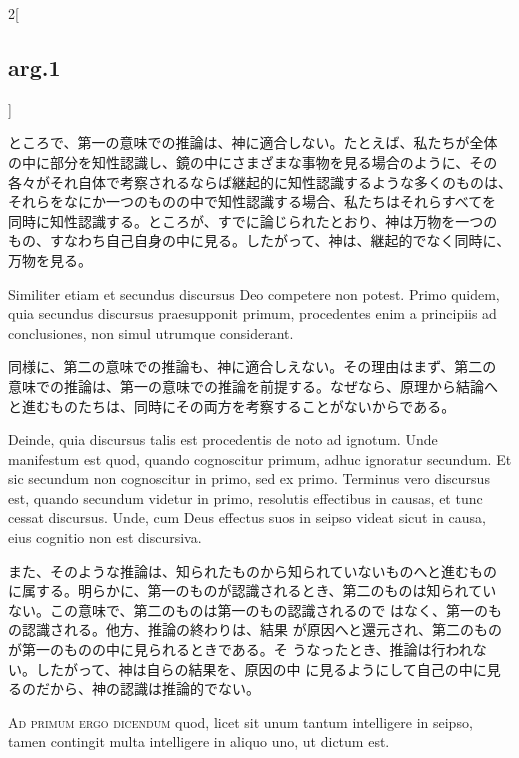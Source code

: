 \documentclass[paper=a4paper,fontsize=10pt,jafontsize=9pt,titlepage]{jlreq}
\begin{document}
\begin{paracol}{2}[\subsection{arg.1}]
\switchcolumn

ところで、第一の意味での推論は、神に適合しない。たとえば、私たちが全体
の中に部分を知性認識し、鏡の中にさまざまな事物を見る場合のように、その
各々がそれ自体で考察されるならば継起的に知性認識するような多くのものは、
それらをなにか一つのものの中で知性認識する場合、私たちはそれらすべてを
同時に知性認識する。ところが、すでに論じられたとおり、神は万物を一つの
もの、すなわち自己自身の中に見る。したがって、神は、継起的でなく同時に、
万物を見る。

\switchcolumn*

Similiter etiam et secundus discursus Deo competere non potest. Primo
quidem, quia secundus discursus praesupponit primum, procedentes enim
a principiis ad conclusiones, non simul utrumque considerant.

\switchcolumn

同様に、第二の意味での推論も、神に適合しえない。その理由はまず、第二の
意味での推論は、第一の意味での推論を前提する。なぜなら、原理から結論へ
と進むものたちは、同時にその両方を考察することがないからである。

\switchcolumn*

Deinde, quia discursus talis est procedentis de noto ad ignotum.  Unde
manifestum est quod, quando cognoscitur primum, adhuc ignoratur
secundum. Et sic secundum non cognoscitur in primo, sed ex
primo. Terminus vero discursus est, quando secundum videtur in primo,
resolutis effectibus in causas, et tunc cessat discursus. Unde, cum
Deus effectus suos in seipso videat sicut in causa, eius cognitio non
est discursiva.

\switchcolumn

また、そのような推論は、知られたものから知られていないものへと進むもの
に属する。明らかに、第一のものが認識されるとき、第二のものは知られてい
ない。この意味で、第二のものは第一のもの認識されるので
はなく、第一のもの認識される。他方、推論の終わりは、結果
が原因へと還元され、第二のものが第一のものの中に見られるときである。そ
うなったとき、推論は行われない。したがって、神は自らの結果を、原因の中
に見るようにして自己の中に見るのだから、神の認識は推論的でない。

\switchcolumn*[\subsection{ad.1}]

{\scshape Ad primum ergo dicendum} quod, licet sit unum tantum
intelligere in seipso, tamen contingit multa intelligere in aliquo
uno, ut dictum est.


\end{paracol}
\end{document}
